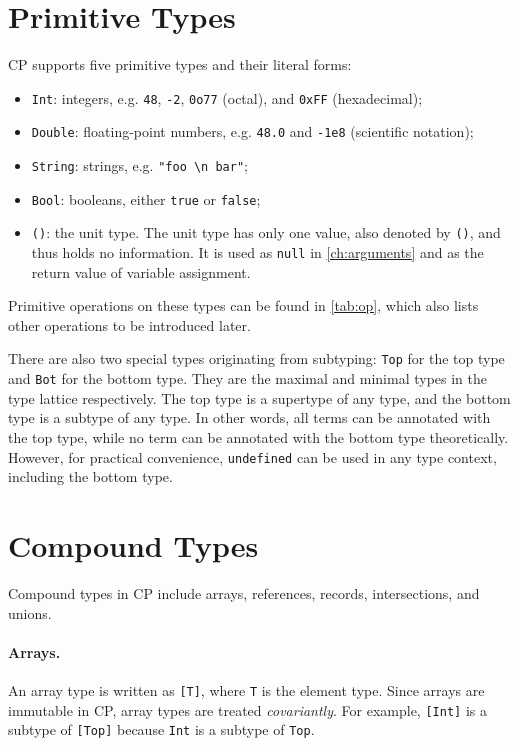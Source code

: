 \section{Primitive Types}

CP supports five primitive types and their literal forms: 
\begin{itemize}
\item \lstinline{Int}: integers, e.g. \lstinline{48}, \lstinline{-2}, \lstinline{0o77} (octal), and \lstinline{0xFF} (hexadecimal);
\item \lstinline{Double}: floating-point numbers, e.g. \lstinline{48.0} and \lstinline{-1e8} (scientific notation);
\item \lstinline{String}: strings, e.g. \lstinline{"foo \n bar"};
\item \lstinline{Bool}: booleans, either \lstinline{true} or \lstinline{false};
\item \lstinline{()}: the unit type. The unit type has only one value, also
      denoted by \lstinline{()}, and thus holds no information. It is used as
      \lstinline{null} in \autoref{ch:arguments} and as the return value of
      variable assignment.
\end{itemize}
Primitive operations on these types can be found in \autoref{tab:op}, which also
lists other operations to be introduced later.

There are also two special types originating from subtyping: \lstinline{Top} for
the top type and \lstinline{Bot} for the bottom type. They are the maximal and
minimal types in the type lattice respectively. The top type is a supertype of
any type, and the bottom type is a subtype of any type. In other words, all
terms can be annotated with the top type, while no term can be annotated with
the bottom type theoretically. However, for practical convenience,
\lstinline{undefined} can be used in any type context, including the bottom
type.

\section{Compound Types}

Compound types in CP include arrays, references, records, intersections, and
unions.

\paragraph{Arrays.}
An array type is written as \lstinline{[T]}, where \lstinline{T} is the element
type. Since arrays are immutable in CP, array types are treated
\emph{covariantly}. For example, \lstinline{[Int]} is a subtype of
\lstinline{[Top]} because \lstinline{Int} is a subtype of \lstinline{Top}.

